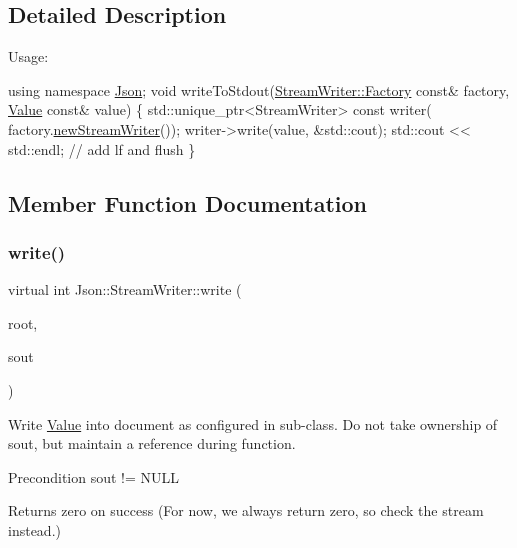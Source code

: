 \subsection{Detailed Description}
Usage\+: 
\begin{DoxyCode}
\textcolor{keyword}{using namespace }\hyperlink{namespaceJson}{Json};
\textcolor{keywordtype}{void} writeToStdout(\hyperlink{classJson_1_1StreamWriter_1_1Factory}{StreamWriter::Factory} \textcolor{keyword}{const}& factory, 
      \hyperlink{classJson_1_1Value}{Value} \textcolor{keyword}{const}& value) \{
  std::unique\_ptr<StreamWriter> \textcolor{keyword}{const} writer(
    factory.\hyperlink{classJson_1_1StreamWriter_1_1Factory_a9d30ec53e8288cd53befccf1009c5f31}{newStreamWriter}());
  writer->write(value, &std::cout);
  std::cout << std::endl;  \textcolor{comment}{// add lf and flush}
\}
\end{DoxyCode}
 

\subsection{Member Function Documentation}
\mbox{\label{classJson_1_1StreamWriter_a84278bad0c9a9fc587bc2a97c5bb5993}} 
\subsubsection{\texorpdfstring{write()}{write()}}
{\footnotesize\ttfamily virtual int Json\+::\+Stream\+Writer\+::write (\begin{DoxyParamCaption}\item[{\hyperlink{classJson_1_1Value}{Value} const \&}]{root,  }\item[{J\+S\+O\+N\+C\+P\+P\+\_\+\+O\+S\+T\+R\+E\+AM $\ast$}]{sout }\end{DoxyParamCaption})\hspace{0.3cm}{\ttfamily [pure virtual]}}

Write \hyperlink{classJson_1_1Value}{Value} into document as configured in sub-\/class. Do not take ownership of sout, but maintain a reference during function. \begin{DoxyPrecond}{Precondition}
sout != N\+U\+LL 
\end{DoxyPrecond}
\begin{DoxyReturn}{Returns}
zero on success (For now, we always return zero, so check the stream instead.) 
\end{DoxyReturn}

